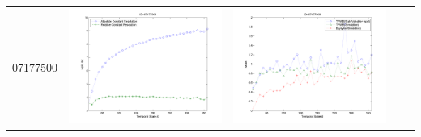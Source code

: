 \documentclass[11pt]{article}
\begin{document}
\begin{table}[H]
{\begin{tabular}{c  c   c   c  c }
07177500&\begin{minipage}{.4\textwidth}\includegraphics[width=\linewidth]{resultgraph/07177500e.png}\end{minipage}
&\begin{minipage}{.4\textwidth}\includegraphics[width=\linewidth]{resultgraph/07177500MI.png}\end{minipage}

\end{tabular}}
\end{table}
\end{document}
